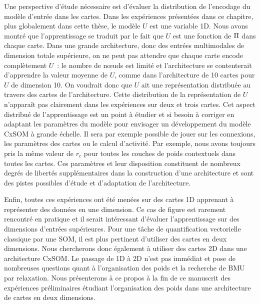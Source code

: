 \documentclass[../main]{subfiles}
\begin{document}
Une perspective d'étude nécessaire est d'évaluer la distribution de l'encodage du modèle d'entrée dans les cartes. 
Dans les expériences présentées dans ce chapitre, plus globalement dans cette thèse, le modèle $U$ est une variable 1D. 
Nous avons montré que l'apprentissage se traduit par le fait que $U$ est une fonction de $\Pi$ dans chaque carte.
Dans une grande architecture, donc des entrées multimodales de dimension totale supérieure, on ne peut pas attendre que chaque carte encode complètement $U$~: le nombre de n\oe{}uds est limité et l'architecture se contenterait d'apprendre la valeur moyenne de $U$, comme dans l'architecture de 10 cartes pour $U$ de dimension 10.
On voudrait donc que $U$ ait une représentation distribuée au travers des cartes de l'architecture. 
Cette distribution de la représentation de $U$ n'apparaît pas clairement dans les expériences sur deux et trois cartes.
Cet aspect distribué de l'apprentissage est un point à étudier et si besoin à corriger en adaptant les paramètres du modèle pour envisager un développement du modèle CxSOM à grande échelle. Il sera par exemple possible de jouer sur les connexions, les paramètres des cartes ou le calcul d'activité.
Par exemple, nous avons toujours pris la  même valeur de $r_c$ pour toutes les couches de poids contextuels dans toutes les cartes. Ces paramètres et leur disposition constituent de nombreux degrés de libertés supplémentaires dans la construction d'une architecture et sont des pistes possibles d'étude et d'adaptation de l'architecture.


Enfin, toutes ces expériences ont été menées sur des cartes 1D apprenant à représenter des données en une dimension. Ce cas de figure est rarement rencontré en pratique et il serait intéressant d'évaluer l'apprentissage sur des dimensions d'entrées supérieures. Pour une tâche de quantification vectorielle classique par une SOM, il est plus pertinent d'utiliser des cartes en deux dimensions. Nous chercherons donc également à utiliser des cartes 2D dans une architecture CxSOM. Le passage de 1D à 2D n'est pas immédiat et pose de nombreuses questions quant à l'organisation des poids et la recherche de BMU par relaxation. 
Nous présenterons à ce propos à la fin de ce manuscrit des expériences préliminaires étudiant l'organisation des poids dans une architecture de cartes en deux dimensions.

\ifSubfilesClassLoaded{
    \printbibliography
}{}
\end{document}
